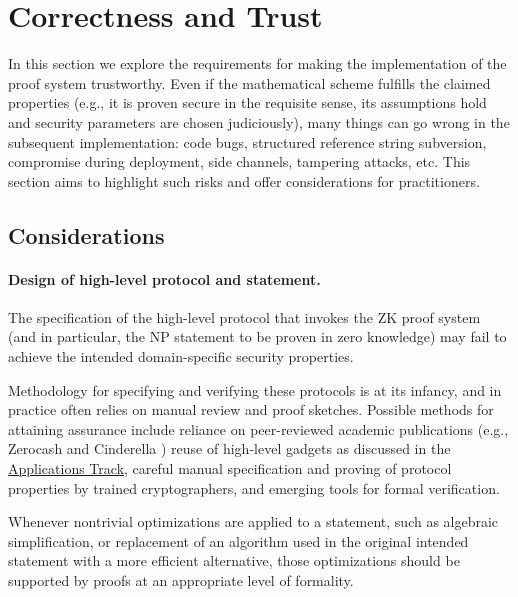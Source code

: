 \section{Correctness and Trust}
\label{implem:correctness}

In this section we explore the requirements for making the implementation of the proof system trustworthy. Even if the mathematical scheme fulfills the claimed properties (e.g., it is proven secure in the requisite sense, its assumptions hold and security parameters are chosen judiciously), many things can go wrong in the subsequent implementation: code bugs, structured reference string subversion, compromise during deployment, side channels, tampering attacks, etc. This section aims to highlight such risks and offer considerations for practitioners.


\subsection{Considerations}


\paragraph{Design of high-level protocol and statement.}

The specification of the high-level protocol that invokes the ZK proof system (and in particular, the NP statement to be proven in zero knowledge) may fail to achieve the intended domain-specific security properties.

Methodology for specifying and verifying these protocols is at its infancy, and in practice often relies on manual review and proof sketches. 
Possible methods for attaining assurance include reliance on peer-reviewed academic publications 
(e.g., Zerocash \cite{2014:SP:Zerocash} %
and Cinderella \cite{2016:SP:cinderella}) %
reuse of high-level gadgets as discussed in the \hyperref[chap:apps]{Applications Track}, careful manual specification and proving of protocol properties by trained cryptographers, and emerging tools for formal verification.

Whenever nontrivial optimizations are applied to a statement, such as algebraic simplification, or replacement of an algorithm used in the original intended statement with a more efficient alternative, those optimizations should be supported by proofs at an appropriate level of formality.

